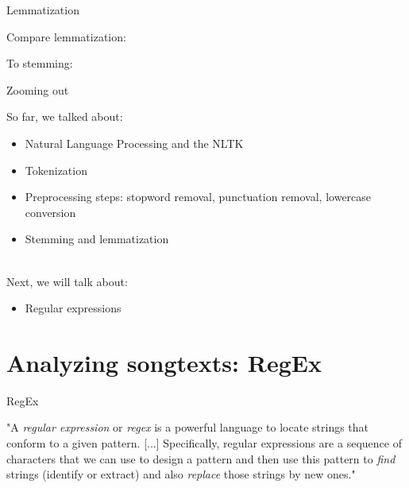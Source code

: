 \documentclass[handout]{beamer}
\begin{document}
\begin{frame}[fragile]{Lemmatization}
	
Compare lemmatization:

\begin{lstlistingoutput}
\end{lstlistingoutput}

To stemming:

\begin{lstlistingoutput}
\end{lstlistingoutput}

\end{frame}


\begin{frame}{Zooming out} 
	
So far, we talked about:
\begin{itemize}
	\item Natural Language Processing and the NLTK
	\item Tokenization
	\item Preprocessing steps: stopword removal, punctuation removal, lowercase conversion
	\item Stemming and lemmatization \\\
\end{itemize}
	
Next, we will talk about:
\begin{itemize}
	\item Regular expressions
\end{itemize}
	
\end{frame}




\section{Analyzing songtexts: RegEx}


\begin{frame}[fragile]{RegEx}
	
	"A \textit{regular expression} or \textit{regex} is a powerful language to locate strings that conform to a given pattern. [...] Specifically, regular expressions are a sequence of characters that we can use to design a pattern and then use this pattern to \textit{find} strings (identify or extract) and also \textit{replace} those strings by new ones." \\
	\begin{tiny}
		\cite{van_atteveldt_computational_2022} 
	\end{tiny}
\end{frame}
\end{document}
